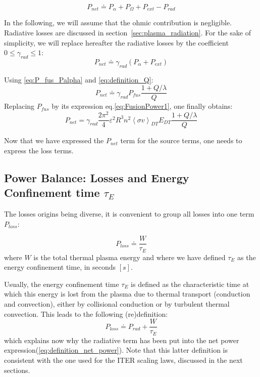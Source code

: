 \begin{equation}
	P_{net} 
	\doteq 
	P_\alpha + P_\Omega + P_{ext} - P_{rad}
\label{eq:definition_net_power}
\end{equation}

In the following, we will assume that the ohmic contribution is negligible. Radiative losses are discussed in section~\ref{sec:plasma_radiation}. For the sake of simplicity, we will replace hereafter the radiative losses by the coefficient $0\leq \gamma_{rad} \leq1$:
\begin{equation*}
P_{net} \doteq \gamma_{rad} (P_\alpha + P_{ext})
\end{equation*}

Using \ref{eq:P_fus_Palpha} and \ref{eq:definition_Q}:
\begin{equation}
\boxed{
	P_{net} 
	\doteq 
	\gamma_{rad}
	P_{fus}
	\frac{1 + Q/\lambda}{Q}
}
\label{eq:Pnet_as_Pfus_Q}
\end{equation}
Replacing $P_{fus}$ by its expression eq.\ref{eq:FusionPower1}, one finally obtains:
\begin{equation}
\boxed{
	P_{net} 
	= 
	\gamma_{rad}
	\frac{2\pi^2}{4}
	\varepsilon^2 R^3
	n^2 \left< \sigma v \right>_{DT} E_{DT}
	\frac{1+Q/\lambda}{Q}
 }
\label{eq:Pnet_QnTR_adv}
\end{equation}

Now that we have expressed the $P_{net}$ term for the source terms, one needs to express the loss terms.

\subsection{Power Balance: Losses and Energy Confinement time $\tau_E$}

The losses origins being diverse, it is convenient to group all losses into one term $P_{loss}$\cite[p.9]{Wesson2004}:

\begin{equation}
	P_{loss} 
	\doteq 
	\frac{ W }{ \tau_E } 
\label{eq:definition_confinement_time_global}
\end{equation}
\noindent
where $W$ is the total thermal plasma energy and where we have defined $\tau_E$ as the energy confinement time, in seconds $[\si{s}]$. 

Usually, the energy confinement time $\tau_E$ is defined as the characteristic time at which this energy is lost from the plasma due to thermal transport (conduction and convection), either by collisional conduction or by turbulent thermal convection. This leads to the following (re)definition\cite[(3.2)]{FusionCEA1987}:
\begin{equation}
	P_{loss} 
	\doteq 
	P_{rad}
	+
	\frac{ W }{ \tau_E } 
\label{eq:definition_confinement_time}
\end{equation}
\noindent
which explains now why the radiative term has been put into the net power expression(\ref{eq:definition_net_power}). Note that this latter definition is consistent with the one used for the ITER scaling laws, discussed in the next sections.


